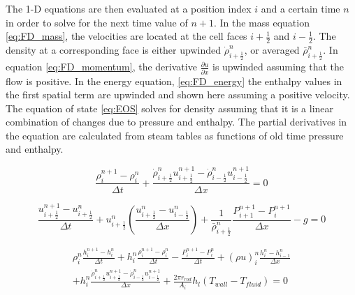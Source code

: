     The 1-D equations are then evaluated at a position index $ i $ and a certain
    time $n$ in order to solve for the next time value of $n+1$. In the mass equation
    \eqref{eq:FD_mass}, the velocities are located at the cell faces
    $i+\frac{1}{2}$ and $i-\frac{1}{2}$. The density at a corresponding face is
    either upwinded $\dot{\rho}_{i+\frac{1}{2}}^{n}$, or averaged
    $\bar{\rho}_{i+\frac{1}{2}}^{n}$. In equation \eqref{eq:FD_momentum}, the
    derivative $\frac{ \partial u}{ \partial x}$ is upwinded assuming that the
    flow is positive. In the energy equation, \eqref{eq:FD_energy} the enthalpy
    values in the first spatial term are upwinded and shown here assuming a
    positive velocity. The equation of state \eqref{eq:EOS} solves for density
    assuming that it is a linear combination of changes due to pressure and
    enthalpy. The partial derivatives in the equation are calculated from
    steam tables as functions of old time pressure and enthalpy. 
    
    \begin{equation}
    	\label{eq:FD_mass}
    	\frac{ \rho_{i}^{n+1}-\rho_{i}^{n}}{ \Delta t} +
    	\frac{ \dot{\rho}_{i+\frac{1}{2}}^{n} u_{i+\frac{1}{2}}^{n+1}  -
    	\dot{\rho}_{i-\frac{1}{2}}^{n}  u_{i-\frac{1}{2}}^{n+1} }{\Delta x}
    	 = 0
    \end{equation}
    
    \begin{equation}
    	\label{eq:FD_momentum}
    	\frac{  u_{i+\frac{1}{2}}^{n+1} - u_{i+\frac{1}{2}}^{n} }{ \Delta t } + 
    	u_{i+\frac{1}{2}}^{n} \left( \frac{  u_{i+\frac{1}{2}}^{n} -
    	u_{i-\frac{1}{2}}^{n}}{ \Delta x} \right) +
    	\frac{1}{\bar{\rho}_{i+\frac{1}{2}}^{n} } 
    	\frac{ P_{i+1}^{n+1} -P_{i}^{n+1} }{ \Delta x } - g
    	= 0
    \end{equation}
    
    \begin{multline}
    	\label{eq:FD_energy}
    	\rho_{i}^{n} \frac{ h_{i}^{n+1} - h_{i}^{n}}{\Delta t} 
    	+ h_{i}^{n} \frac{ \rho_{i}^{n+1} - \rho_{i}^{n}}{\Delta t} 
    	- \frac{P_{i}^{n+1}-P_{i}^{n}}{\Delta t}
    	+ \left( \rho u \right)_{i}^{n} 
    		\frac{   h _{i}^{n}  - h _{i-1}^{n} }{\Delta x}  \\
    	+ h _{i}^{n} \frac{ \dot{\rho}_{i+\frac{1}{2}}^{n} u_{i+\frac{1}{2}}^{n+1} 
    	- \dot{\rho}_{i-\frac{1}{2}}^{n}  u_{i-\frac{1}{2}}^{n+1} }{\Delta x}
    	+ \frac{2\pi r_{rod}}{A_{i}}h_{l}\left(T_{wall}-T_{fluid}\right)
    	= 0
    \end{multline}
    
